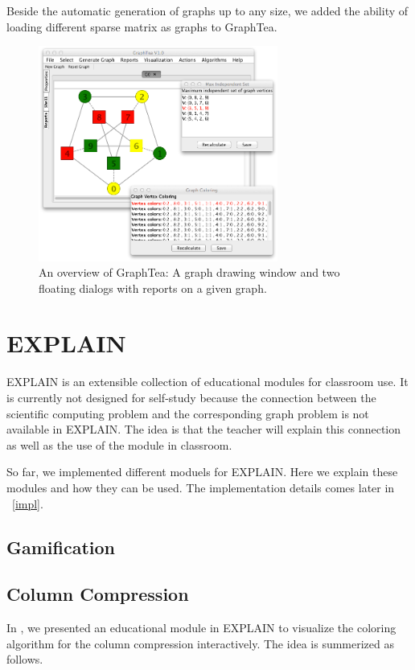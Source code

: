 \documentclass[12pt, oneside]{book}
\begin{document}
Beside the automatic generation of graphs up to any size, we added the ability of loading
different sparse matrix as graphs to GraphTea.

\begin{figure}
\centering
\includegraphics[width=0.7\textwidth]{graphtea}
\caption{An overview of GraphTea: A graph drawing window and 
two floating dialogs with reports on a given graph.}
\label{f.graphtea}
\end{figure}




\chapter{EXPLAIN}
\label{explain}
\mbox{EXPLAIN} is an extensible collection of educational modules for classroom use.
It is currently not designed for self-study because the connection between the scientific computing problem and the corresponding graph problem is not available in \mbox{EXPLAIN}. The idea is that the teacher will explain this connection as well as the use of the module in classroom.

So far, we implemented different moduels for EXPLAIN. 
Here we explain these modules and how they can be used.
The implementation details comes later in ~\ref{impl}.
\section{Gamification}
\section{Column Compression}
\label{s.column-compression}
In \cite{2013:05,2014:01}, we presented an educational module in \mbox{EXPLAIN} to visualize the
coloring algorithm for the column compression interactively. The idea is 
summerized as follows.
\end{document}
